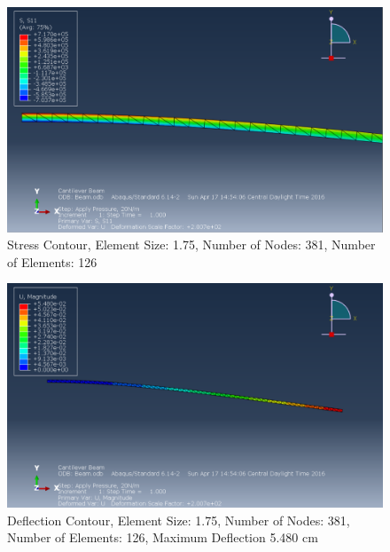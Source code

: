 \documentclass[a4paper]{article}
\begin{document}
\begin{figure}[ht]
\centering
\includegraphics[scale=.5]{6Nsize1_75Stress.PNG}
\caption{Stress Contour, Element Size: 1.75, Number of Nodes: 381, Number of Elements: 126}
\end{figure}
\begin{figure}[ht]
\centering
\includegraphics[scale=.5]{6Nsize1_75MDisplacement.PNG}
\caption{Deflection Contour, Element Size: 1.75, Number of Nodes: 381, Number of Elements: 126, Maximum Deflection 5.480 cm}
\end{figure}
\end{document}
